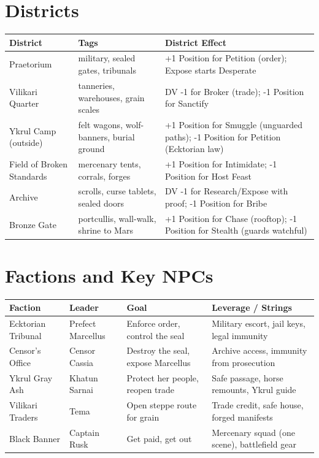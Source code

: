 \documentclass[10pt,twoside]{book}
\begin{document}
\section{Districts}

\begin{longtable}{p{3.5cm} p{5cm} p{4cm}}
\toprule
\textbf{District} & \textbf{Tags} & \textbf{District Effect} \\
\midrule
Praetorium & military, sealed gates, tribunals & +1 Position for Petition (order); Expose starts Desperate \\
Vilikari Quarter & tanneries, warehouses, grain scales & DV -1 for Broker (trade); -1 Position for Sanctify \\
Ykrul Camp (outside) & felt wagons, wolf-banners, burial ground & +1 Position for Smuggle (unguarded paths); -1 Position for Petition (Ecktorian law) \\
Field of Broken Standards & mercenary tents, corrals, forges & +1 Position for Intimidate; -1 Position for Host Feast \\
Archive & scrolls, curse tablets, sealed doors & DV -1 for Research/Expose with proof; -1 Position for Bribe \\
Bronze Gate & portcullis, wall-walk, shrine to Mars & +1 Position for Chase (rooftop); -1 Position for Stealth (guards watchful) \\
\bottomrule
\end{longtable}

\section{Factions and Key NPCs}

\begin{longtable}{p{3cm} p{2.5cm} p{4.5cm} p{3.5cm}}
\toprule
\textbf{Faction} & \textbf{Leader} & \textbf{Goal} & \textbf{Leverage / Strings} \\
\midrule
Ecktorian Tribunal & Prefect Marcellus & Enforce order, control the seal & Military escort, jail keys, legal immunity \\
Censor's Office & Censor Cassia & Destroy the seal, expose Marcellus & Archive access, immunity from prosecution \\
Ykrul Gray Ash & Khatun Sarnai & Protect her people, reopen trade & Safe passage, horse remounts, Ykrul guide \\
Vilikari Traders & Tema & Open steppe route for grain & Trade credit, safe house, forged manifests \\
Black Banner & Captain Rusk & Get paid, get out & Mercenary squad (one scene), battlefield gear \\
\bottomrule
\end{longtable}
\end{document}
